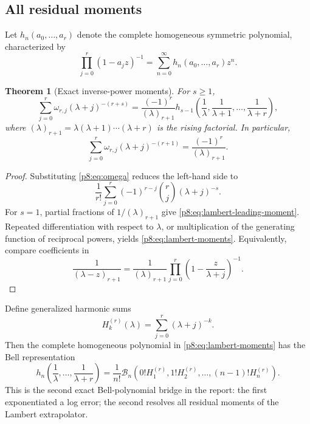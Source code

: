 \documentclass[11pt]{article}
\numberwithin{equation}{section}
\newtheorem{theorem}{Theorem}[section]
\theoremstyle{definition}
\theoremstyle{remark}
\begin{document}
\subsection{All residual moments}

Let $h_n(a_0,\ldots,a_r)$ denote the complete homogeneous symmetric polynomial, characterized by
\begin{equation}
\prod_{j=0}^{r}(1-a_jz)^{-1}
=\sum_{n=0}^{\infty}h_n(a_0,\ldots,a_r)z^n.
\label{p8:eq:complete-homogeneous}
\end{equation}

\begin{theorem}[Exact inverse-power moments]
\label{p8:thm:lambert-moments}
For $s\ge1$,
\begin{equation}
\sum_{j=0}^{r}\omega_{r,j}(\lambda+j)^{-(r+s)}
=\frac{(-1)^r}{(\lambda)_{r+1}}
 h_{s-1}\!\left(\frac1\lambda,\frac1{\lambda+1},\ldots,
\frac1{\lambda+r}\right),
\label{p8:eq:lambert-moments}
\end{equation}
where $(\lambda)_{r+1}=\lambda(\lambda+1)\cdots(\lambda+r)$ is the rising factorial. In particular,
\begin{equation}
\sum_{j=0}^{r}\omega_{r,j}(\lambda+j)^{-(r+1)}
=\frac{(-1)^r}{(\lambda)_{r+1}}.
\label{p8:eq:lambert-leading-moment}
\end{equation}
\end{theorem}

\begin{proof}
Substituting \cref{p8:eq:omega} reduces the left-hand side to
\[
\frac1{r!}\sum_{j=0}^{r}(-1)^{r-j}\binom{r}{j}(\lambda+j)^{-s}.
\]
For $s=1$, partial fractions of $1/(\lambda)_{r+1}$ give \cref{p8:eq:lambert-leading-moment}. Repeated differentiation with respect to $\lambda$, or multiplication of the generating function of reciprocal powers, yields \cref{p8:eq:lambert-moments}. Equivalently, compare coefficients in
\[
\frac{1}{(\lambda-z)_{r+1}}
=\frac{1}{(\lambda)_{r+1}}
\prod_{j=0}^{r}\left(1-\frac{z}{\lambda+j}\right)^{-1}.
\]
\end{proof}

Define generalized harmonic sums
\begin{equation}
H_k^{(r)}(\lambda)=\sum_{j=0}^{r}(\lambda+j)^{-k}.
\label{p8:eq:Hrk}
\end{equation}
Then the complete homogeneous polynomial in \cref{p8:eq:lambert-moments} has the Bell representation
\begin{equation}
h_n\!\left(\frac1\lambda,\ldots,\frac1{\lambda+r}\right)
=\frac1{n!}\mathcal B_n\!\left(
0!H_1^{(r)},1!H_2^{(r)},\ldots,(n-1)!H_n^{(r)}
\right).
\label{p8:eq:h-Bell}
\end{equation}
This is the second exact Bell-polynomial bridge in the report: the first exponentiated a log error; the second resolves all residual moments of the Lambert extrapolator.
\end{document}

